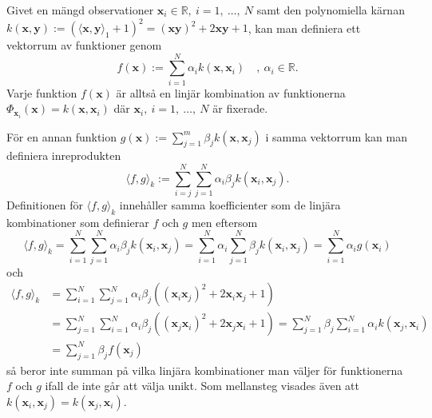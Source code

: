 \documentclass[a4paper, 12pt]{report}
\theoremstyle{definition}
\theoremstyle{remark}
\newcommand{\bfx}{\mathbf{x}}
\newcommand{\bfy}{\mathbf{y}}
\begin{document}
Givet en mängd observationer $\bfx_i\in\mathbb{R},~i=1,~\dots,~N$ samt den polynomiella kärnan $k\left(\bfx, \bfy\right):=\left(\langle \bfx, \bfy \rangle_1 + 1\right)^2 = \left(\bfx\bfy\right)^{2} + 2\bfx\bfy + 1$, kan man definiera ett vektorrum av funktioner genom
\begin{equation*}
	f\left(\bfx\right):=\sum_{i=1}^{N}\alpha_ik\left(\bfx, \bfx_i\right)\quad ,~\alpha_i\in\mathbb{R}.
\end{equation*}
Varje funktion $f\left(\bfx\right)$ är alltså en linjär kombination av funktionerna $\Phi_{\bfx_i}\left(\bfx\right)=k\left(\bfx,\bfx_i\right)$ där $\bfx_i,~i=1,~\dots,~N$ är fixerade. %

För en annan funktion $g\left(\bfx\right):=\sum_{j=1}^{m}\beta_jk\left(\bfx, \bfx_j\right)$ i samma vektorrum kan man definiera inreprodukten
\begin{equation}\label{eq:polykärnaprodukt}
	\langle f , g\rangle_k := \sum_{i=j}^{N}\sum_{j=1}^{N} \alpha_i \beta_j k\left(\bfx_i, \bfx_j\right).
\end{equation}
Definitionen för $\langle f, g \rangle_k$ innehåller samma koefficienter som de linjära kombinationer som definierar $f$ och $g$ men eftersom
\begin{equation}\label{eq:expansion1}
	\langle f, g \rangle_k = \sum_{i=1}^{N} \sum_{j=1}^{N} \alpha_i \beta_j k\left(\bfx_i, \bfx_j\right) = \sum_{i=1}^{N} \alpha_i \sum_{j=1}^{N}\beta_j k\left(\bfx_i, \bfx_j\right)=\sum_{i=1}^{N} \alpha_i g\left(\bfx_i\right)
\end{equation}
och
\begin{equation}\label{eq:expansion2}
\begin{aligned}
	\langle f, g \rangle_k &= \sum_{i=1}^{N} \sum_{j=1}^{N} \alpha_i \beta_j \left(\left(\bfx_i\bfx_j\right)^2 + 2\bfx_i\bfx_j+1\right)\\
	&= \sum_{j=1}^{N} \sum_{i=1}^{N} \alpha_i \beta_j \left(\left(\bfx_j\bfx_i\right)^2 + 2\bfx_j\bfx_i+1\right) = \sum_{j=1}^{N} \beta_j \sum_{i=1}^{N}\alpha_i k\left(\bfx_j, \bfx_i\right) \\
	&= \sum_{j=1}^{N} \beta_j f\left(\bfx_j\right)
\end{aligned}
\end{equation}
så beror inte summan på vilka linjära kombinationer man väljer för funktionerna $f$ och $g$ ifall de inte går att välja unikt. Som mellansteg visades även att $k\left(\bfx_i,\bfx_j\right)=k\left(\bfx_j, \bfx_i\right)$.
\end{document}
